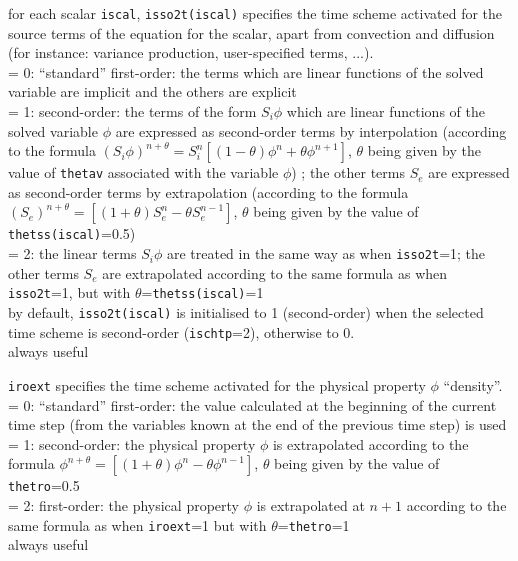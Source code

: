 {for each scalar {\tt iscal}, {\tt isso2t(iscal)} specifies the time scheme activated
for the source terms of the equation for the scalar, apart from convection and
diffusion (for instance: variance production, user-specified terms, ...).\\
\hspace*{1.3cm}= 0: ``standard'' first-order: the terms which are linear
functions of the solved variable are implicit and the others are explicit\\
\hspace*{1.3cm}= 1: second-order: the terms of the form $S_i\phi$ which are
linear functions of the solved variable
$\phi$ are expressed as second-order terms by interpolation (according
to the formula
$(S_i\phi)^{n+\theta}=S_i^n[(1-\theta)\phi^n+\theta\phi^{n+1}]$, $\theta$
being given by the value of {\tt thetav} associated with the variable $\phi$)
; the other terms $S_e$ are expressed as second-order terms by
extrapolation (according to the formula
$(S_e)^{n+\theta}=[(1+\theta)S_e^n-\theta S_e^{n-1}]$, $\theta$ being
given by the value of {\tt thetss(iscal)}=0.5)\\
\hspace*{1.3cm}= 2: the linear terms $S_i\phi$ are treated in the same
way as when {\tt isso2t}=1;
the other terms $S_e$ are extrapolated according to the same formula
as when {\tt isso2t}=1, but with $\theta$={\tt thetss(iscal)}=1\\
by default, {\tt isso2t(iscal)} is initialised to 1 (second-order) when the selected
time scheme is second-order ({\tt ischtp}=2), otherwise to 0.\\
always useful}


{{\tt iroext} specifies the time scheme activated
for the physical property $\phi$ ``density''.\\
\hspace*{1.3cm}= 0: ``standard'' first-order: the value calculated at
the beginning of the current time step (from the
variables known at the end of the previous time step) is used \\
\hspace*{1.3cm}= 1: second-order: the physical property $\phi$ is
extrapolated according to the formula
$\phi^{n+\theta}=[(1+\theta)\phi^n-\theta \phi^{n-1}]$, $\theta$ being
given by the value of {\tt thetro}=0.5 \\
\hspace*{1.3cm}= 2: first-order: the physical property $\phi$ is
extrapolated at $n+1$ according to the
same formula as when {\tt iroext}=1 but with $\theta$={\tt thetro}=1\\
always useful}

